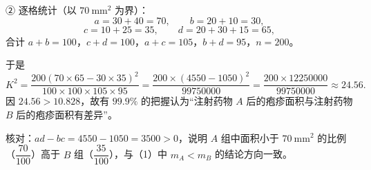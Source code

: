 \begin{answer}
② 逐格统计（以 $70\ \mathrm{mm}^2$ 为界）：
\nopagebreak[4]
\[a=30+40=70,\qquad b=20+10=30,\]
\nopagebreak[4]
\[c=10+25=35,\qquad d=20+30+15=65,\]
合计 $a+b=100$，$c+d=100$，$a+c=105$，$b+d=95$，$n=200$。

于是
\nopagebreak[4]
\[K^2=\frac{200(70\times65-30\times35)^2}{100\times100\times105\times95}
=\frac{200\times(4550-1050)^2}{99750000}
=\frac{200\times12250000}{99750000}\approx24.56.\]
因 $24.56>10.828$，故有 $99.9\%$ 的把握认为“注射药物 $A$ 后的疱疹面积与注射药物 $B$ 后的疱疹面积有差异”。

核对：$ad-bc=4550-1050=3500>0$，说明 $A$ 组中面积小于 $70\ \mathrm{mm}^2$ 的比例（$\dfrac{70}{100}$）高于 $B$ 组（$\dfrac{35}{100}$），与（1）中 $m_A<m_B$ 的结论方向一致。


\end{answer}

